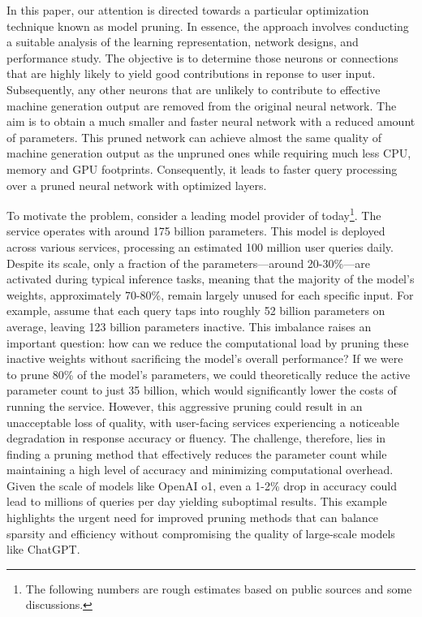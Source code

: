 \documentclass{article} %
\begin{document}
In this paper, our attention is directed towards a particular optimization technique known as model pruning. In essence, the approach involves conducting a suitable analysis of the learning representation, network designs, and performance study. The objective is to determine those neurons or connections that are highly likely to yield good contributions in reponse to user input. Subsequently, any other neurons that are unlikely to contribute to effective machine generation output are removed from the original neural network. The aim is to obtain a much smaller and faster neural network with a reduced amount of parameters. This pruned network can achieve almost the same quality of machine generation output as the unpruned ones while requiring much less CPU, memory and GPU footprints. Consequently, it leads to faster query processing over a pruned neural network with optimized layers.

To motivate the problem, consider a leading model provider of today\footnote{The following numbers are rough estimates based on public sources and some discussions.}. The service operates with around 175 billion parameters. This model is deployed across various services, processing an estimated 100 million user queries daily. Despite its scale, only a fraction of the parameters—around 20-30\%—are activated during typical inference tasks, meaning that the majority of the model’s weights, approximately 70-80\%, remain largely unused for each specific input. For example, assume that each query taps into roughly 52 billion parameters on average, leaving 123 billion parameters inactive. 
This imbalance raises an important question: how can we reduce the computational load by pruning these inactive weights without sacrificing the model's overall performance? If we were to prune 80\% of the model’s parameters, we could theoretically reduce the active parameter count to just 35 billion, which would significantly lower the costs of running the service.
However, this aggressive pruning could result in an unacceptable loss of quality, with user-facing services experiencing a noticeable degradation in response accuracy or fluency. The challenge, therefore, lies in finding a pruning method that effectively reduces the parameter count while maintaining a high level of accuracy and minimizing computational overhead. Given the scale of models like OpenAI o1, even a 1-2\% drop in accuracy could lead to millions of queries per day yielding suboptimal results. This example highlights the urgent need for improved pruning methods that can balance sparsity and efficiency without compromising the quality of large-scale models like ChatGPT.
\end{document}
